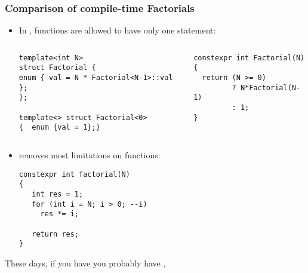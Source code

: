 \begin{frame}[fragile,t]
\frametitle{Comparison of compile-time Factorials}
\begin{itemize}[<+->]
\item In , \cexpr functions are allowed to have only one
  statement:
\vskip 12pt
\begin{columns}[t]
{\scriptsize\begin{verbatim}
template<int N>
struct Factorial {
enum { val = N * Factorial<N-1>::val };
};

template<> struct Factorial<0> 
{  enum {val = 1};}
\end{verbatim}
}

{\scriptsize\begin{verbatim}
constexpr int Factorial(N)
{
  return (N >= 0) 
         ? N*Factorial(N-1)
         : 1;
}
\end{verbatim}
}
\end{columns}
\vskip 6pt
\item {} removes most limitations on \cexpr functions:
{\scriptsize\begin{verbatim}
constexpr int factorial(N)
{
   int res = 1;
   for (int i = N; i > 0; --i)
     res *= i;

   return res;
}
\end{verbatim}
} 

\end{itemize}
\pause
\begin{center}
These days, if you have  you probably have ,
\end{center}

\end{frame}

